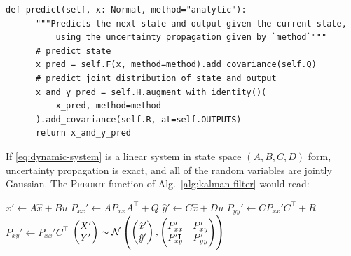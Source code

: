 \documentclass[oneside, article]{memoir}
\begin{document}
\begin{minipage}{\textwidth}
\begin{verbatim}
def predict(self, x: Normal, method="analytic"):
      """Predicts the next state and output given the current state,
          using the uncertainty propagation given by `method`"""
      # predict state
      x_pred = self.F(x, method=method).add_covariance(self.Q)
      # predict joint distribution of state and output
      x_and_y_pred = self.H.augment_with_identity()(
          x_pred, method=method
      ).add_covariance(self.R, at=self.OUTPUTS)
      return x_and_y_pred
\end{verbatim}
\end{minipage}
If \eqref{eq:dynamic-system} is a linear system in state space \((A,
B, C, D)\) form,
uncertainty propagation is exact, and all of the random variables are
jointly Gaussian.
The \textsc{Predict} function of Alg.~\ref{alg:kalman-filter} would read:
\begin{algorithmic}
  \State \(\hat x' \gets A \hat x + B u\)
  \State \(P_{xx}' \gets A P_{xx} A^\intercal + Q\)
  \State \(\hat y' \gets C \hat x + D u\)
  \State \(P_{yy}' \gets C P_{xx}' C^\intercal + R\)
  \State \(P_{xy}' \gets P_{xx}' C^\intercal\)
  \State \Return \(
    \begin{pmatrix} X' \\ Y'
    \end{pmatrix} \sim \mathcal N \del{
      \begin{pmatrix} \hat x' \\ \hat y'
      \end{pmatrix},
      \begin{pmatrix} P_{xx}' & P_{xy}' \\ P_{xy}'^\intercal & P_{yy}'
  \end{pmatrix}}\)
  \EndFunction
\end{algorithmic}
\end{document}
